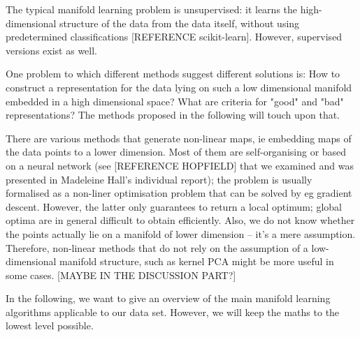 \documentclass[journal, a4paper]{IEEEtran}
\begin{document}
The typical manifold learning problem is unsupervised: it learns the high-dimensional structure of the data from the data itself, without using predetermined classifications [REFERENCE scikit-learn]. However, supervised versions exist as well.

One problem to which different methods suggest different solutions is: How to construct a representation for the data lying on such a low dimensional manifold embedded in a high dimensional space? What are criteria for "good" and "bad" representations? The methods proposed in the following will touch upon that.


There are various methods that generate non-linear maps, ie embedding maps of the data points to a lower dimension. Most of them are self-organising or based on a neural network (see [REFERENCE HOPFIELD] that we examined and was presented in Madeleine Hall's individual report); the problem is usually formalised as a non-liner optimisation problem that can be solved by eg gradient descent. However, the latter only guarantees to return a local optimum; global optima are in general difficult to obtain efficiently. Also, we do not know whether the points actually lie on a manifold of lower dimension -- it's a mere assumption.
Therefore, non-linear methods that do not rely on the assumption of a low-dimensional manifold structure, such as kernel PCA might be more useful in some cases. [MAYBE IN THE DISCUSSION PART?]

In the following, we want to give an overview of the main manifold learning algorithms applicable to our data set. However, we will keep the maths to the lowest level possible.

\end{document}
